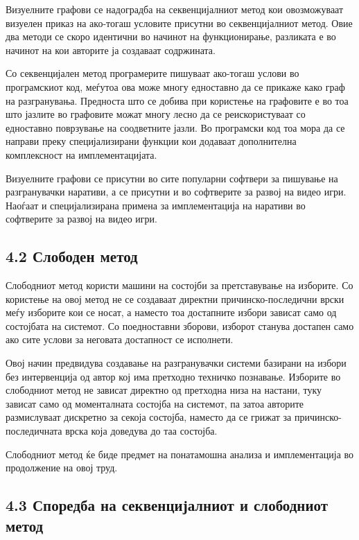 Визуелните графови се надоградба на секвенцијалниот метод кои овозможуваат визуелен приказ на ако-тогаш условите присутни во секвенцијалниот метод. Овие два методи се скоро идентични во начинот на функционирање, разликата е во начинот на кои авторите ја создаваат содржината.

Со секвенцијален метод програмерите пишуваат ако-тогаш услови во програмскиот код, меѓутоа ова може многу едноставно да се прикаже како граф на разгранувања. Предноста што се добива при користење на графовите е во тоа што јазлите во графовите можат многу лесно да се реискористуваат со едноставно поврзување на соодветните јазли. Во програмски код тоа мора да се направи преку специјализирани функции кои додаваат дополнителна комплексност на имплементацијата.

Визуелните графови се присутни во сите популарни софтвери за пишување на разгранувачки наративи, а се присутни и во софтверите за развој на видео игри. Наоѓаат и специјализирана примена за имплементација на наративи во софтверите за развој на видео игри.

\subsection{4.2 Слободен метод}

Слободниот метод користи машини на состојби за претставување на изборите. Со користење на овој метод не се создаваат директни причинско-последични врски меѓу изборите кои се носат, а наместо тоа достапните избори зависат само од состојбата на системот. Со поедноставни зборови, изборот станува достапен само ако сите услови за неговата достапност се исполнети.

Овој начин предвидува создавање на разгранувачки системи базирани на избори без интервенција од автор кој има претходно техничко познавање. Изборите во слободниот метод не зависат директно од претходна низа на настани, туку зависат само од моменталната состојба на системот, па затоа авторите размислуваат дискретно за секоја состојба, наместо да се грижат за причинско-последичната врска која доведува до таа состојба.

Слободниот метод ќе биде предмет на понатамошна анализа и имплементација во продолжение на овој труд.

\subsection{4.3 Споредба на секвенцијалниот и слободниот метод}

